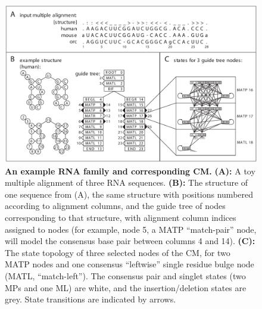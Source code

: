 \begin{figure}
\begin{center}
\includegraphics[width=6.4in]{figs/cmintro_bandcyk}
\caption{\textbf{An example RNA family and corresponding CM.}
  \textbf{(A):} A toy multiple alignment of three RNA
  sequences. \textbf{(B):} The structure of one sequence from (A), the
  same structure with positions numbered according to alignment
  columns, and the guide tree of nodes corresponding to that
  structure, with alignment column indices assigned to nodes (for
  example, node 5, a MATP ``match-pair'' node, will model the
  consensus base pair between columns 4 and 14). \textbf{(C):} The
  state topology of three selected nodes of the CM, for two MATP nodes
  and one consensus ``leftwise'' single residue bulge node (MATL,
  ``match-left'').  The consensus pair and singlet states (two MPs and
  one ML) are white, and the insertion/deletion states are grey. State
  transitions are indicated by arrows.}
\label{fig:cmintro}
\end{center}
\end{figure}
